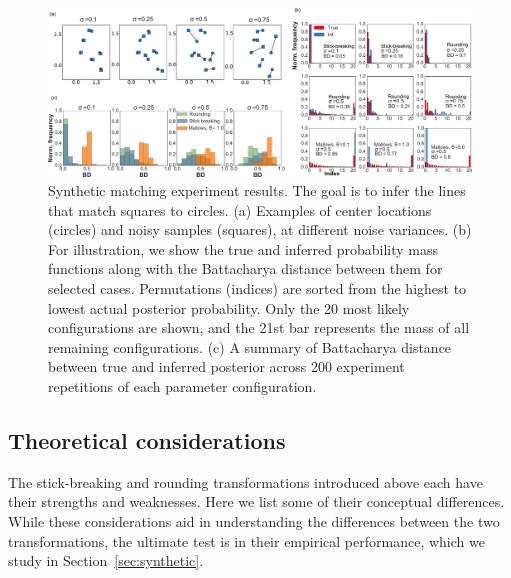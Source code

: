 \documentclass[twoside]{article}
\begin{document}
\begin{figure}[ht] 
   \centering
   \includegraphics[width=6in]{../figures/figure8.pdf}
   \caption{Synthetic matching experiment results. The goal is to
     infer the lines that match squares to circles. (a) Examples of
     center locations (circles) and noisy samples (squares), at
     different noise variances. (b) For illustration, we show the true
     and inferred probability mass functions along with the
     Battacharya distance between them for selected
     cases. Permutations (indices) are sorted from the highest to
     lowest actual posterior probability. Only the 20 most likely
     configurations are shown, and the 21st bar represents the mass of
     all remaining configurations. (c) A summary of Battacharya
     distance between true and inferred posterior across 200
     experiment repetitions of each parameter configuration.}
   \label{fig:synthetic}
\end{figure}

\subsection{Theoretical considerations}
\label{sec:considerations}

The stick-breaking and rounding transformations introduced above each
have their strengths and weaknesses.  Here we list some of their
conceptual differences.  While these considerations aid in
understanding the differences between the two transformations, the
ultimate test is in their empirical performance, which we study in
Section~\ref{sec:synthetic}.
\end{document}
